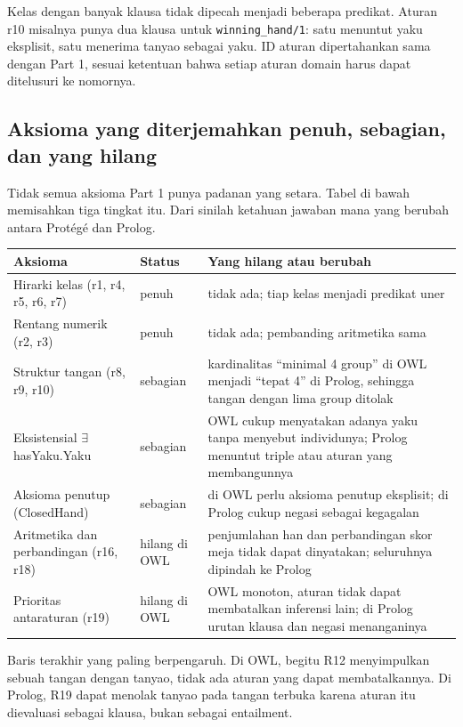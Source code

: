 \documentclass[11pt,a4paper]{article}
\newcommand{\code}[1]{\texttt{#1}}
\begin{document}
Kelas dengan banyak klausa tidak dipecah menjadi beberapa predikat. Aturan r10 misalnya
punya dua klausa untuk \code{winning_hand/1}: satu menuntut yaku eksplisit, satu menerima
tanyao sebagai yaku. ID aturan dipertahankan sama dengan Part 1, sesuai ketentuan bahwa
setiap aturan domain harus dapat ditelusuri ke nomornya.

\subsection{Aksioma yang diterjemahkan penuh, sebagian, dan yang hilang}

Tidak semua aksioma Part 1 punya padanan yang setara. Tabel di bawah memisahkan tiga tingkat
itu. Dari sinilah ketahuan jawaban mana yang berubah antara Protégé dan Prolog.

\begin{table}[h]
\centering\small
\begin{tabular}{@{}p{4.6cm}p{2.4cm}p{6.9cm}@{}}
\toprule
Aksioma & Status & Yang hilang atau berubah \\
\midrule
Hirarki kelas (r1, r4, r5, r6, r7) & penuh & tidak ada; tiap kelas menjadi predikat uner \\
Rentang numerik (r2, r3) & penuh & tidak ada; pembanding aritmetika sama \\
Struktur tangan (r8, r9, r10) & sebagian & kardinalitas ``minimal 4 group'' di OWL menjadi
``tepat 4'' di Prolog, sehingga tangan dengan lima group ditolak \\
Eksistensial $\exists$hasYaku.Yaku & sebagian & OWL cukup menyatakan adanya yaku tanpa
menyebut individunya; Prolog menuntut triple atau aturan yang membangunnya \\
Aksioma penutup (ClosedHand) & sebagian & di OWL perlu aksioma penutup eksplisit; di Prolog
cukup negasi sebagai kegagalan \\
Aritmetika dan perbandingan (r16, r18) & hilang di OWL & penjumlahan han dan perbandingan
skor meja tidak dapat dinyatakan; seluruhnya dipindah ke Prolog \\
Prioritas antaraturan (r19) & hilang di OWL & OWL monoton, aturan tidak dapat membatalkan
inferensi lain; di Prolog urutan klausa dan negasi menanganinya \\
\bottomrule
\end{tabular}
\end{table}

Baris terakhir yang paling berpengaruh. Di OWL, begitu R12 menyimpulkan sebuah tangan
dengan tanyao, tidak ada aturan yang dapat membatalkannya. Di Prolog, R19 dapat menolak tanyao
pada tangan terbuka karena aturan itu dievaluasi sebagai klausa, bukan sebagai entailment.
\end{document}
